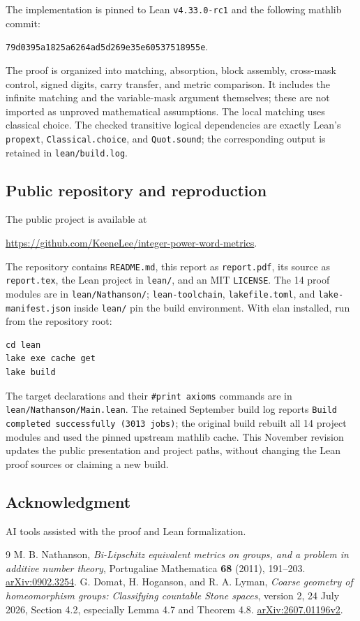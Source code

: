 \documentclass[11pt]{article}
\begin{document}
The implementation is pinned to Lean \texttt{v4.33.0-rc1} and the following
mathlib commit:
\begin{center}\small\texttt{79d0395a1825a6264ad5d269e35e60537518955e}.\end{center}
The proof is organized into matching, absorption, block assembly,
cross-mask control, signed digits, carry transfer, and metric comparison.
It includes the infinite matching and the variable-mask argument themselves;
these are not imported as unproved mathematical assumptions. The local
matching uses classical choice. The checked transitive logical dependencies
are exactly Lean's \texttt{propext}, \texttt{Classical.choice}, and
\texttt{Quot.sound}; the corresponding output is retained in
\texttt{lean/build.log}.

\subsection*{Public repository and reproduction}
The public project is available at
\begin{center}\small
\url{https://github.com/KeeneLee/integer-power-word-metrics}.
\end{center}
The repository contains \texttt{README.md}, this report as
\texttt{report.pdf}, its source as \texttt{report.tex}, the Lean project in
\texttt{lean/}, and an MIT \texttt{LICENSE}. The 14 proof modules are in
\texttt{lean/Nathanson/}; \texttt{lean-toolchain}, \texttt{lakefile.toml},
and \texttt{lake-manifest.json} inside \texttt{lean/} pin the build environment.
With elan installed, run from the repository root:
\begin{verbatim}
cd lean
lake exe cache get
lake build
\end{verbatim}
The target declarations and their \texttt{\#print axioms} commands are in
\texttt{lean/Nathanson/Main.lean}. The retained September build log reports
\texttt{Build completed successfully (3013 jobs)}; the original build rebuilt
all 14 project modules and used the pinned upstream mathlib cache.
This November revision updates the public presentation and project paths,
without changing the Lean proof sources or claiming a new build.

\subsection*{Acknowledgment}
AI tools assisted with the proof and Lean formalization.

\begin{thebibliography}{9}
M. B. Nathanson, \emph{Bi-Lipschitz equivalent metrics on groups, and a problem
in additive number theory}, Portugaliae Mathematica \textbf{68} (2011),
191--203. \href{https://arxiv.org/abs/0902.3254}{arXiv:0902.3254}.
G. Domat, H. Hoganson, and R. A. Lyman,
\emph{Coarse geometry of homeomorphism groups: Classifying countable Stone spaces},
version 2, 24 July 2026, Section 4.2, especially Lemma 4.7 and Theorem 4.8.
\href{https://arxiv.org/abs/2607.01196v2}{arXiv:2607.01196v2}.
\end{thebibliography}
\end{document}
